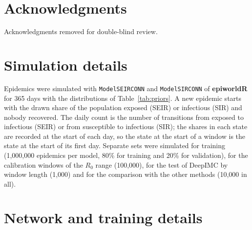 \documentclass[12pt]{article}
\begin{document}
\section*{Acknowledgments}
Acknowledgments removed for double-blind review.

\printbibliography

\appendix

\section{Simulation details}\label{sec:sim-parameters}

Epidemics were simulated with \texttt{ModelSEIRCONN} and \texttt{ModelSIRCONN} of \textbf{epiworldR} for
365 days with the distributions of Table~\ref{tab:priors}. A new epidemic starts with the drawn share of
the population exposed (SEIR) or infectious (SIR) and nobody recovered. The daily count is the number of
transitions from exposed to infectious (SEIR) or from susceptible to infectious (SIR); the shares in each
state are recorded at the start of each day, so the state at the start of a window is the state at the
start of its first day. Separate sets were simulated for training (1,000,000 epidemics per model, 80\% for
training and 20\% for validation), for the calibration windows of the $R_0$ range (100,000), for the test
of DeepIMC by window length (1,000) and for the comparison with the other methods (10,000 in all).

\section{Network and training details}\label{app:training}

\begin{table}[htbp]
\centering
\caption{Settings of the two DeepIMC models. The search space of the hyperparameter search is given in
brackets.}
\label{tab:hyper}
\small
{}
\end{table}
\end{document}
